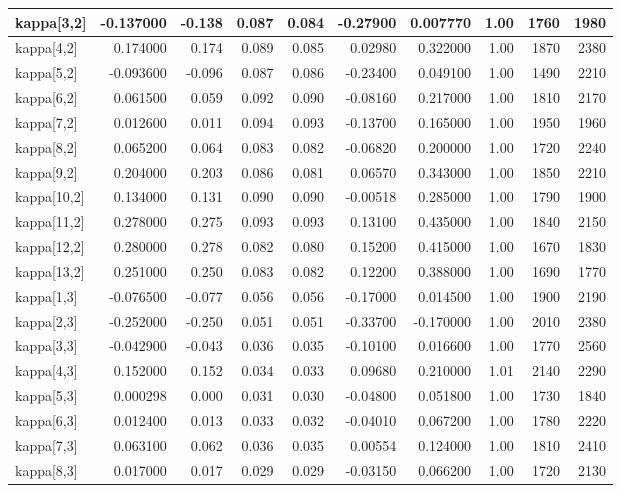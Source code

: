 \documentclass[
]{article}
\begin{document}
\begin{longtable*}[t]{l|r|r|r|r|r|r|r|r|r}
\hline
kappa[3,2] & -0.137000 & -0.138 & 0.087 & 0.084 & -0.27900 & 0.007770 & 1.00 & 1760 & 1980\\
\hline
kappa[4,2] & 0.174000 & 0.174 & 0.089 & 0.085 & 0.02980 & 0.322000 & 1.00 & 1870 & 2380\\
\hline
kappa[5,2] & -0.093600 & -0.096 & 0.087 & 0.086 & -0.23400 & 0.049100 & 1.00 & 1490 & 2210\\
\hline
kappa[6,2] & 0.061500 & 0.059 & 0.092 & 0.090 & -0.08160 & 0.217000 & 1.00 & 1810 & 2170\\
\hline
kappa[7,2] & 0.012600 & 0.011 & 0.094 & 0.093 & -0.13700 & 0.165000 & 1.00 & 1950 & 1960\\
\hline
kappa[8,2] & 0.065200 & 0.064 & 0.083 & 0.082 & -0.06820 & 0.200000 & 1.00 & 1720 & 2240\\
\hline
kappa[9,2] & 0.204000 & 0.203 & 0.086 & 0.081 & 0.06570 & 0.343000 & 1.00 & 1850 & 2210\\
\hline
kappa[10,2] & 0.134000 & 0.131 & 0.090 & 0.090 & -0.00518 & 0.285000 & 1.00 & 1790 & 1900\\
\hline
kappa[11,2] & 0.278000 & 0.275 & 0.093 & 0.093 & 0.13100 & 0.435000 & 1.00 & 1840 & 2150\\
\hline
kappa[12,2] & 0.280000 & 0.278 & 0.082 & 0.080 & 0.15200 & 0.415000 & 1.00 & 1670 & 1830\\
\hline
kappa[13,2] & 0.251000 & 0.250 & 0.083 & 0.082 & 0.12200 & 0.388000 & 1.00 & 1690 & 1770\\
\hline
kappa[1,3] & -0.076500 & -0.077 & 0.056 & 0.056 & -0.17000 & 0.014500 & 1.00 & 1900 & 2190\\
\hline
kappa[2,3] & -0.252000 & -0.250 & 0.051 & 0.051 & -0.33700 & -0.170000 & 1.00 & 2010 & 2380\\
\hline
kappa[3,3] & -0.042900 & -0.043 & 0.036 & 0.035 & -0.10100 & 0.016600 & 1.00 & 1770 & 2560\\
\hline
kappa[4,3] & 0.152000 & 0.152 & 0.034 & 0.033 & 0.09680 & 0.210000 & 1.01 & 2140 & 2290\\
\hline
kappa[5,3] & 0.000298 & 0.000 & 0.031 & 0.030 & -0.04800 & 0.051800 & 1.00 & 1730 & 1840\\
\hline
kappa[6,3] & 0.012400 & 0.013 & 0.033 & 0.032 & -0.04010 & 0.067200 & 1.00 & 1780 & 2220\\
\hline
kappa[7,3] & 0.063100 & 0.062 & 0.036 & 0.035 & 0.00554 & 0.124000 & 1.00 & 1810 & 2410\\
\hline
kappa[8,3] & 0.017000 & 0.017 & 0.029 & 0.029 & -0.03150 & 0.066200 & 1.00 & 1720 & 2130\\

\end{longtable*}
\end{document}
